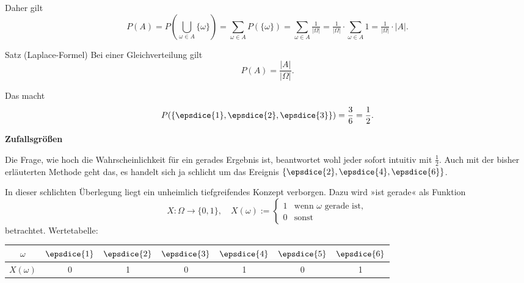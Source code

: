 \documentclass[9pt]{beamer}
\newcommand{\strong}[1]{\textsf{\textbf{#1}}}
\newcommand{\parspace}{\vspace{0.8em}}
\newcommand\dice[1]{\vcenter{\hbox{\epsdice{#1}}}}
\begin{document}
\begin{frame}
Daher gilt
\[P(A) = P(\bigcup_{\omega\in A}\{\omega\})
= \sum_{\omega\in A} P(\{\omega\}) = \sum_{\omega\in A}\tfrac{1}{|\Omega|}
= \tfrac{1}{|\Omega|}\cdot\sum_{\omega\in A} 1 = \tfrac{1}{|\Omega|}\cdot |A|.
\]\pause
\begin{block}{Satz (Laplace-Formel)}
Bei einer Gleichverteilung gilt
\[P(A) = \frac{|A|}{|\Omega|}.\]
\end{block}\pause
Das macht
\[P(\{\dice{1},\dice{2},\dice{3}\}) = \frac{3}{6} = \frac{1}{2}.\]
\end{frame}

\begin{frame}
\begin{center}
\strong{Zufallsgrößen}
\end{center}
\end{frame}

\begin{frame}
Die Frage, wie hoch die Wahrscheinlichkeit für ein gerades Ergebnis
ist, beantwortet wohl jeder sofort intuitiv mit $\tfrac{1}{2}$. Auch
mit der bisher erläuterten Methode geht das, es handelt sich ja
schlicht um das Ereignis $\{\dice{2},\dice{4},\dice{6}\}$.\pause

\parspace
In dieser schlichten Überlegung liegt ein unheimlich tiefgreifendes
Konzept verborgen. Dazu wird »ist gerade« als Funktion
\[X\colon\Omega\to\{0,1\},\quad
X(\omega) := \begin{cases}
1 & \text{wenn $\omega$ gerade ist},\\
0 & \text{sonst}
\end{cases}\]
betrachtet.\pause{} Wertetabelle:
\begin{center}
\begin{tabular}{c|cccccc}
$\omega$ & $\dice{1}$ & $\dice{2}$ & $\dice{3}$ & $\dice{4}$ & $\dice{5}$ & $\dice{6}$\\
\midrule
$X(\omega)$ & 0 & 1 & 0 & 1 & 0 & 1
\end{tabular}
\end{center}
\end{frame}
\end{document}

